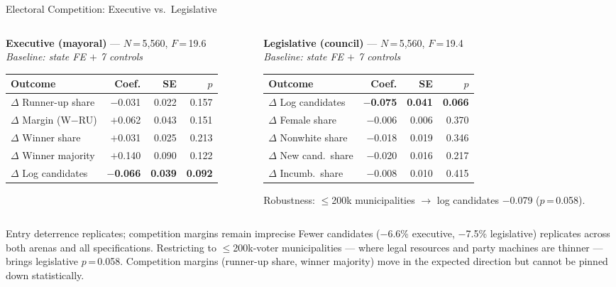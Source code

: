 \documentclass[aspectratio=169,10pt]{beamer}
\begin{document}
\begin{frame}{Electoral Competition: Executive vs.\ Legislative}
\begin{columns}[T]
\begin{column}{0.50\textwidth}
\footnotesize
\textbf{Executive (mayoral)} --- $N$\,=\,5,560, $F$\,=\,19.6\\[1pt]
\textit{Baseline: state FE $+$ 7 controls}
\smallskip
\renewcommand{\arraystretch}{1.15}
\begin{tabular}{L{2.9cm}rrr}
  \toprule
  Outcome & Coef. & SE & $p$ \\
  \midrule
  $\Delta$ Runner-up share  & $-$0.031 & 0.022 & 0.157 \\
  $\Delta$ Margin (W$-$RU)  & $+$0.062 & 0.043 & 0.151 \\
  $\Delta$ Winner share     & $+$0.031 & 0.025 & 0.213 \\
  $\Delta$ Winner majority  & $+$0.140 & 0.090 & 0.122 \\
  $\Delta$ Log candidates   & $-$\textbf{0.066} & \textbf{0.039} & \textbf{0.092} \\
  \bottomrule
\end{tabular}
\normalsize
\end{column}
\begin{column}{0.48\textwidth}
\footnotesize
\textbf{Legislative (council)} --- $N$\,=\,5,560, $F$\,=\,19.4\\[1pt]
\textit{Baseline: state FE $+$ 7 controls}
\smallskip
\renewcommand{\arraystretch}{1.15}
\begin{tabular}{L{2.7cm}rrr}
  \toprule
  Outcome & Coef. & SE & $p$ \\
  \midrule
  $\Delta$ Log candidates  & $-$\textbf{0.075} & \textbf{0.041} & \textbf{0.066} \\
  $\Delta$ Female share    & $-$0.006 & 0.006 & 0.370 \\
  $\Delta$ Nonwhite share  & $-$0.018 & 0.019 & 0.346 \\
  $\Delta$ New cand.\ share & $-$0.020 & 0.016 & 0.217 \\
  $\Delta$ Incumb.\ share  & $-$0.008 & 0.010 & 0.415 \\
  \bottomrule
\end{tabular}
\smallskip
\scriptsize Robustness: $\leq$200k municipalities $\to$ log candidates $-$0.079 ($p$\,=\,0.058).\normalsize
\end{column}
\end{columns}
\smallskip
\begin{alertblock}{Entry deterrence replicates; competition margins remain imprecise}
  \footnotesize
  Fewer candidates ($-$6.6\% executive, $-$7.5\% legislative) replicates across both arenas and all specifications. Restricting to $\leq$200k-voter municipalities --- where legal resources and party machines are thinner --- brings legislative $p$\,=\,0.058. Competition margins (runner-up share, winner majority) move in the expected direction but cannot be pinned down statistically.
\end{alertblock}
\end{frame}
\end{document}
